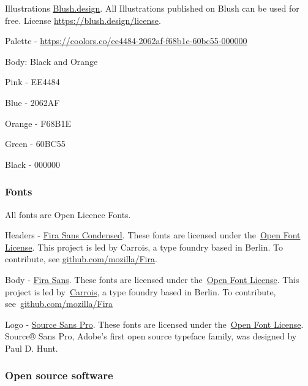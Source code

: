 \documentclass{article}
\begin{document}
Illustrations \href{https://blush.design/}{Blush.design}. All Illustrations published on Blush can be used for free. License \href{https://blush.design/license}{https://blush.design/license}.


Palette - \href{https://coolors.co/ee4484-2062af-f68b1e-60bc55-000000}{https://coolors.co/ee4484-2062af-f68b1e-60bc55-000000}


Body: Black and Orange


Pink - EE4484


Blue - 2062AF


Orange - F68B1E


Green - 60BC55


Black - 000000


\subsubsection{Fonts}\label{H649993}



All fonts are Open Licence Fonts.


Headers - \href{https://fonts.google.com/specimen/Fira+Sans+Condensed}{Fira Sans Condensed}. These fonts are licensed under the \href{https://scripts.sil.org/cms/scripts/page.php?site_id=nrsi&id=OFL}{Open Font License}. This project is led by Carrois, a type foundry based in Berlin. To contribute, see \href{https://github.com/mozilla/Fira}{github.com/mozilla/Fira}.


Body - \href{https://fonts.google.com/specimen/Fira+Sans}{Fira Sans}. These fonts are licensed under the \href{https://scripts.sil.org/cms/scripts/page.php?site_id=nrsi&id=OFL}{Open Font License}. This project is led by \href{https://carrois.com/}{Carrois}, a type foundry based in Berlin. To contribute, see \href{https://github.com/mozilla/Fira}{github.com/mozilla/Fira} 


Logo - \href{https://fonts.google.com/specimen/Source+Sans+Pro}{Source Sans Pro}. These fonts are licensed under the \href{https://scripts.sil.org/cms/scripts/page.php?site_id=nrsi&id=OFL}{Open Font License}. Source® Sans Pro, Adobe's first open source typeface family, was designed by Paul D. Hunt. 


\subsubsection{Open source software}\label{H319315}
\end{document}
